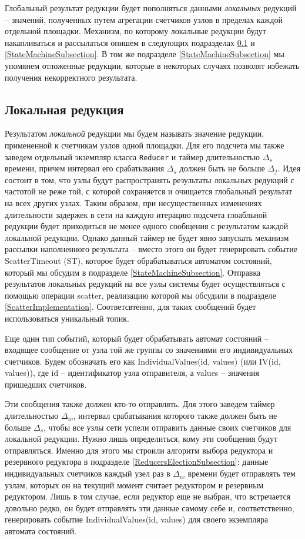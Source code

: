\documentclass{article}
\theoremstyle{plain}
\theoremstyle{plain}
\theoremstyle{plain}
\theoremstyle{plain}
\theoremstyle{definition}
\theoremstyle{remark}
\theoremstyle{plain}
\begin{document}
Глобальный результат редукции будет пополняться данными \textit{локальных} редукций -- значений, полученных путем агрегации счетчиков узлов в пределах каждой отдельной площадки. Механизм, по которому локальные редукции будут накапливаться и рассылаться опишем в следующих подразделах \ref{LocalReductionsSubection} и \ref{StateMachineSubsection}. В том же подразделе \ref{StateMachineSubsection} мы упомянем отложенные редукции, которые в некоторых случаях позволят избежать получения некорректного результата.

\subsection{Локальная редукция}
\label{LocalReductionsSubection}

Результатом \textit{локальной} редукции мы будем называть значение редукции, примененной к счетчикам узлов одной площадки. Для его подсчета мы также заведем отдельный экземпляр класса \texttt{Reducer} и таймер длительностью $\Delta_s$ времени, причем интервал его срабатывания $\Delta_s$ должен быть не больше $\Delta_f$. Идея состоит в том, что узлы будут распространять результаты локальных редукций с частотой не реже той, с которой сохраняется и очищается глобальный результат на всех других узлах. Таким образом, при несущественных изменениях длительности задержек в сети на каждую итерацию подсчета глоабльной редукции будет приходиться не менее одного сообщения с результатом каждой локальной редукции. Однако данный таймер не будет явно запускать механизм рассылки наполненного результата -- вместо этого он будет генерировать событие ScatterTimeout (ST), которое будет обрабатываться автоматом состояний, который мы обсудим в подразделе \ref{StateMachineSubsection}. Отправка результатов локальных редукций на все узлы системы будет осуществляться с помощью операции scatter, реализацию которой мы обсудили в подразделе \ref{ScatterImplementation}. Соответсвтенно, для таких сообщений будет использоваться уникальный топик.

Еще один тип событий, который будет обрабатывать автомат состояний -- входящее сообщение от узла той же группы со значениями его индивидуальных счетчиков. Будем обозначать его как IndividualValues(id, values) (или IV(id, values)), где id -- идентификатор узла отправителя, а values -- значения пришедших счетчиков.

Эти сообщения также должен кто-то отправлять. Для этого заведем таймер длительностью $\Delta_{iv}$, интервал срабатывания которого также должен быть не больше $\Delta_s$, чтобы все узлы сети успели отправить данные своих счетчиков для локальной редукции. Нужно лишь определиться, кому эти сообщения будут отправляться. Именно для этого мы строили алгоритм выбора редуктора и резервного редуктора в подразделе \ref{ReducersElectionSubsection}: данные индивидуальных счетчиков каждый узел раз в $\Delta_{iv}$ времени будет отправлять тем узлам, которых он на текущий момент считает редуктором и резервным редуктором. Лишь в том случае, если редуктор еще не выбран, что встречается довольно редко, он будет отправлять эти данные самому себе и, соответственно, генерировать событие IndividualValues(id, values) для своего экземпляра автомата состояний.
\end{document}
